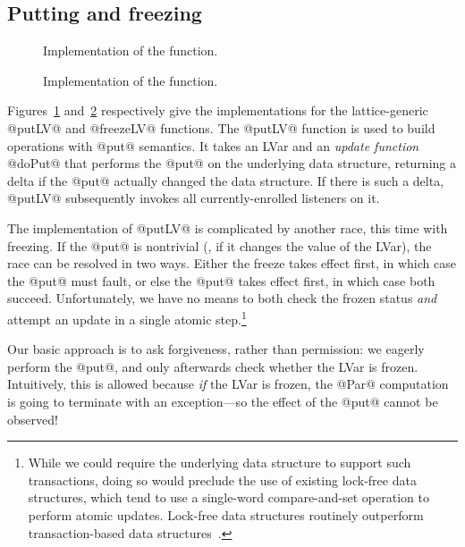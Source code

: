 \subsection{Putting and freezing}

\begin{figure}
  
  \caption{Implementation of the 
    function.}\label{fig:implementation-putLV}
\end{figure}

\begin{figure}
  
  \caption{Implementation of the 
    function.}\label{fig:implementation-freezeLV}
\end{figure}

Figures~\ref{fig:implementation-putLV}
and~\ref{fig:implementation-freezeLV} respectively give the
implementations for the lattice-generic @putLV@ and @freezeLV@
functions.  The @putLV@ function is used to build operations with
@put@ semantics.  It takes an LVar and an \emph{update function}
@doPut@ that performs the @put@ on the underlying data structure,
returning a delta if the @put@ actually changed the data structure.
If there is such a delta, @putLV@ subsequently invokes all
currently-enrolled listeners on it.

The implementation of @putLV@ is complicated by another race, this
time with freezing.  If the @put@ is nontrivial (\ie, if it changes
the value of the LVar), the race can be resolved in two ways.  Either
the freeze takes effect first, in which case the @put@ must fault, or
else the @put@ takes effect first, in which case both succeed.
Unfortunately, we have no means to both check the frozen status
\emph{and} attempt an update in a single atomic step.\footnote{While
  we could require the underlying data structure to support such
  transactions, doing so would preclude the use of existing lock-free
  data structures, which tend to use a single-word compare-and-set
  operation to perform atomic updates.  Lock-free data structures
  routinely outperform transaction-based data
  structures~\cite{practical-lock-freedom}.}

Our basic approach is to ask forgiveness, rather than permission: we
eagerly perform the @put@, and only afterwards check whether the LVar
is frozen.  Intuitively, this is allowed because \emph{if} the LVar is
frozen, the @Par@ computation is going to terminate with an
exception---so the effect of the @put@ cannot be observed!

